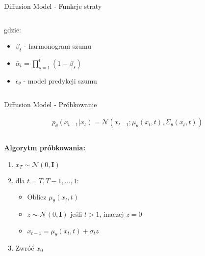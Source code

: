 \documentclass{beamer}
\begin{document}
\begin{frame}{Diffusion Model - Funkcje straty}
\begin{columns}
\begin{column}{0.5\textwidth}
      gdzie:
      \begin{itemize}
        \item $\beta_t$ - harmonogram szumu
        \item $\bar{\alpha}_t = \prod_{s=1}^{t} (1-\beta_s)$
        \item $\epsilon_\theta$ - model predykcji szumu
      \end{itemize}
    \end{column}
  \end{columns}
\end{frame}

\begin{frame}{Diffusion Model - Próbkowanie}
  \begin{tcolorbox}[colback=yellow!10!white, colframe=black!60, boxrule=0.5pt, arc=3mm]
    \begin{align*}
    p_\theta(x_{t-1}|x_t) = \mathcal{N}(x_{t-1}; \mu_\theta(x_t, t), \Sigma_\theta(x_t, t))
    \end{align*}
  \end{tcolorbox}
  
  \begin{columns}
    \begin{column}{0.5\textwidth}
      \textbf{Algorytm próbkowania:}
      \begin{enumerate}
        \item $x_T \sim \mathcal{N}(0, \mathbf{I})$
        \item dla $t = T, T-1, \ldots, 1$:
        \begin{itemize}
          \item Oblicz $\mu_\theta(x_t, t)$
          \item $z \sim \mathcal{N}(0, \mathbf{I})$ jeśli $t > 1$, inaczej $z = 0$
          \item $x_{t-1} = \mu_\theta(x_t, t) + \sigma_t z$
        \end{itemize}
        \item Zwróć $x_0$
      \end{enumerate}
    \end{column}
    \begin{column}{0.5\textwidth}
\end{column}
\end{columns}
\end{frame}
\end{document}
